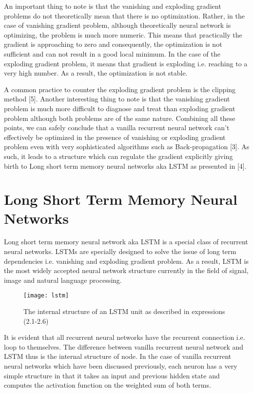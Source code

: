 An important thing to note is that the vanishing and exploding gradient problems do not theoretically mean that there is no optimization. Rather, in the case of vanishing gradient problem, although theoretically neural network is optimizing, the problem is much more numeric. This means that practically the gradient is approaching to zero and consequently, the optimization is not sufficient and can not result in a good local minimum. In the case of the exploding gradient problem, it means that gradient is exploding i.e. reaching to a very high number. As a result, the optimization is not stable. 

A common practice to counter the exploding gradient problem is the clipping method [5]. Another interesting thing to note is that the vanishing gradient problem is much more difficult to diagnose and treat than exploding gradient problem although both problems are of the same nature. Combining all these points, we can safely conclude that a vanilla recurrent neural network can't effectively be optimized in the presence of vanishing or exploding gradient problem even with very sophisticated algorithms such as Back-propagation [3]. As such, it leads to a structure which can regulate the gradient explicitly giving birth to Long short term memory neural networks aka LSTM as presented in [4].

\newpage

\section {Long Short Term Memory Neural Networks}

Long short term memory neural network aka LSTM is a special class of recurrent neural networks. LSTMs are specially designed to solve the issue of long term dependencies i.e. vanishing and exploding gradient problem. As a result, LSTM is the most widely accepted neural network structure currently in the field of signal, image and natural language processing. 

\begin{figure}
\centering
\texttt{[image: lstm]}
\caption{The internal structure of an LSTM unit as described in expressions (2.1-2.6)}
\end{figure}

It is evident that all recurrent neural networks have the recurrent connection i.e. loop to themselves. The difference between vanilla recurrent neural network and LSTM thus is the internal structure of node. In the case of vanilla recurrent neural networks which have been discussed previously, each neuron has a very simple structure in that it takes an input and previous hidden state and computes the activation function on the weighted sum of both terms.

